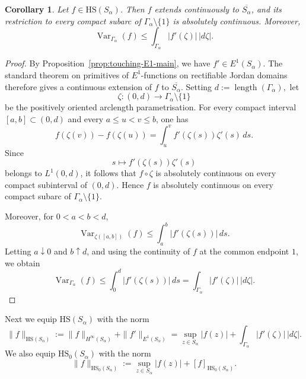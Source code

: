 \documentclass[11pt]{amsart}
\numberwithin{equation}{section}
\newtheorem{corollary}[theorem]{Corollary}
\theoremstyle{definition}
\theoremstyle{plain}
\newcommand{\HS}{\mathrm{HS}}
\begin{document}




\begin{corollary}\label{cor:HS-absolute-continuity}
Let $f\in\HS(S_\alpha)$.  Then $f$ extends continuously to
$\overline{S_\alpha}$, and its restriction to every compact subarc of
$\Gamma_\alpha\setminus\{1\}$ is absolutely continuous.  Moreover,
\[
    \operatorname{Var}_{\Gamma_\alpha}(f)
    \le
    \int_{\Gamma_\alpha}|f'(\zeta)|\,|d\zeta|.
\]
\end{corollary}

\begin{proof}
By Proposition~\ref{prop:touching-E1-main}, we have
$f'\in E^1(S_\alpha)$.  The standard theorem on primitives of
$E^1$-functions on rectifiable Jordan domains therefore gives a
continuous extension of $f$ to $\overline{S_\alpha}$.
Setting
\(
    d:=\operatorname{length}(\Gamma_\alpha),
\)
let
\[
    \zeta:(0,d)\longrightarrow\Gamma_\alpha\setminus\{1\}
\]
be the positively oriented arclength parametrisation.  For every compact
interval $[a,b]\subset(0,d)$ and every $a\le u<v\le b$, one has
\[
    f(\zeta(v))-f(\zeta(u))
    =
    \int_u^v f'(\zeta(s))\zeta'(s)\,ds.
\]
Since
\[
    s\longmapsto f'(\zeta(s))\zeta'(s)
\]
belongs to $L^1(0,d)$, it follows that $f\circ\zeta$ is absolutely
continuous on every compact subinterval of $(0,d)$.  Hence $f$ is
absolutely continuous on every compact subarc of
$\Gamma_\alpha\setminus\{1\}$.

Moreover, for $0<a<b<d$,
\[
    \operatorname{Var}_{\zeta([a,b])}(f)
    \le
    \int_a^b |f'(\zeta(s))|\,ds.
\]
Letting $a\downarrow0$ and $b\uparrow d$, and using the continuity of
$f$ at the common endpoint $1$, we obtain
\[
    \operatorname{Var}_{\Gamma_\alpha}(f)
    \le
    \int_0^d |f'(\zeta(s))|\,ds
    =
    \int_{\Gamma_\alpha}|f'(\zeta)|\,|d\zeta|.
\]
\end{proof}


Next we equip \(\HS(S_\alpha)\)
with the norm
\begin{equation}\label{eq:HS-norm}
        \|f\|_{\HS(S_\alpha)}
        := \|f\|_{H^\infty(S_\alpha)}+
        \|f'\|_{E^1(S_\alpha)}=
        \sup_{z\in S_\alpha}|f(z)|
        +
        \int_{\Gamma_\alpha}|f'(\zeta)|\,|d\zeta|.
\end{equation}
We also equip $\HS_0(S_\alpha)$ with the norm
\[
        \|f\|_{\HS_0(S_\alpha)}
        :=
        \sup_{z\in S_\alpha}|f(z)|+[f]_{\HS_0(S_\alpha)}.
        \]
\end{document}
